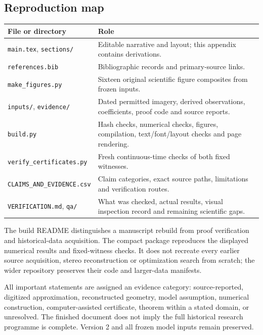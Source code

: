 \subsection*{Reproduction map}
\begin{tabularx}{\textwidth}{@{}>{\raggedright\arraybackslash}p{}>{\raggedright\arraybackslash}X@{}}\toprule
File or directory & Role\\\midrule
\texttt{main.tex}, \texttt{sections/} & Editable narrative and layout; this appendix contains derivations.\\
\texttt{references.bib} & Bibliographic records and primary-source links.\\
\texttt{make\_figures.py} & Sixteen original scientific figure composites from frozen inputs.\\
\texttt{inputs/}, \texttt{evidence/} & Dated permitted imagery, derived observations, coefficients, proof code and source reports.\\
\texttt{build.py} & Hash checks, numerical checks, figures, compilation, text/font/layout checks and page rendering.\\
\texttt{verify\_certificates.py} & Fresh continuous-time checks of both fixed witnesses.\\
\texttt{CLAIMS\_AND\_EVIDENCE.csv} & Claim categories, exact source paths, limitations and verification routes.\\
\texttt{VERIFICATION.md}, \texttt{qa/} & What was checked, actual results, visual inspection record and remaining scientific gaps.\\\bottomrule
\end{tabularx}
\medskip

The build README distinguishes a manuscript rebuild from proof verification and historical-data acquisition. The compact package reproduces the displayed numerical results and fixed-witness checks. It does not recreate every earlier source acquisition, stereo reconstruction or optimization search from scratch; the wider repository preserves their code and larger-data manifests.

All important statements are assigned an evidence category: source-reported, digitized approximation, reconstructed geometry, model assumption, numerical construction, computer-assisted certificate, theorem within a stated domain, or unresolved. The finished document does not imply the full historical research programme is complete. Version 2 and all frozen model inputs remain preserved.
